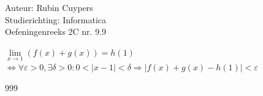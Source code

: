 \documentclass[a4paper]{article}
\begin{document}
  
\noindent \large Auteur: Rubin Cuypers \\
\noindent \large Studierichting: Informatica\\
\noindent \large Oefeningenreeks 2C nr. 9.9\\

\medskip

\normalsize

$\lim\limits_{x\to1}(f(x)+g(x))=h(1)$\\

$\Leftrightarrow \forall \varepsilon >0, \exists \delta>0: 0< |x-1| <\delta \Rightarrow |f(x)+g(x)-h(1)|<\varepsilon $\\



\begin{thebibliography}{999}
\end{thebibliography}
\end{document}
